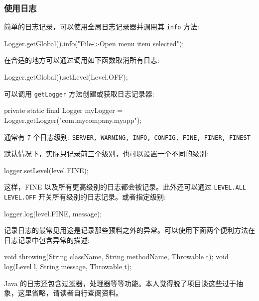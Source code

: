 \subsubsection{使用日志}

简单的日志记录，可以使用全局日志记录器并调用其 \texttt{info} 方法:

\begin{Java}
Logger.getGlobal().info("File->Open menu item selected");
\end{Java}

在合适的地方可以通过调用如下函数取消所有日志:
\begin{Java}
Logger.getGlobal().setLevel(Level.OFF);
\end{Java}

可以调用 \texttt{getLogger} 方法创建或获取日志记录器:

\begin{Java}
private static final Logger myLogger = Logger.getLogger("com.mycompany.myapp");
\end{Java}


通常有 7 个日志级别: \texttt{SERVER, WARNING, INFO, CONFIG, FINE, FINER, FINEST}

默认情况下，实际只记录前三个级别，也可以设置一个不同的级别:

\begin{Java}
logger.setLevel(level.FINE);
\end{Java}

这样，FINE 以及所有更高级别的日志都会被记录。此外还可以通过 \texttt{LEVEL.ALL LEVEL.OFF} 开关所有级别的日志记录。或者指定级别:

\begin{Java}
logger.log(level.FINE, message);
\end{Java}

记录日志的最常见用途是记录那些预料之外的异常。可以使用下面两个便利方法在日志记录中包含异常的描述:

\begin{Java}
void throwing(String className, String methodName, Throwable t);
void log(Level l, String message, Throwable t);
\end{Java}

Java 的日志还包含过滤器，处理器等等功能。本人觉得脱了项目谈这些过于抽象，这里省略，请读者自行查阅资料。

\newpage